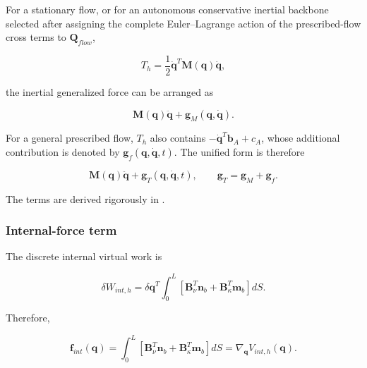For a stationary flow, or for an autonomous conservative inertial backbone selected after assigning the complete Euler--Lagrange action of the prescribed-flow cross terms to \(\mathbf{Q}_{flow}\),

\begin{equation}
\label{eq:galerkin-2-66}
T_{h} = \frac{1}{2}{\dot{\mathbf{q}}}^{T}\mathbf{M}\left( \mathbf{q} \right)\dot{\mathbf{q}},
\end{equation}

the inertial generalized force can be arranged as

\begin{equation}
\label{eq:galerkin-2-67}
\mathbf{M}\left( \mathbf{q} \right)\ddot{\mathbf{q}} + \mathbf{g}_{M}\left( \mathbf{q},\dot{\mathbf{q}} \right).
\end{equation}

For a general prescribed flow, \(T_{h}\) also contains \(- {\dot{\mathbf{q}}}^{T}\mathbf{b}_{A} + c_{A}\), whose additional contribution is denoted by \(\mathbf{g}_{f}\left( \mathbf{q},\dot{\mathbf{q}},t \right)\). The unified form is therefore

\begin{equation}
\label{eq:galerkin-2-68}
\boxed{\mathbf{M}\left( \mathbf{q} \right)\ddot{\mathbf{q}} + \mathbf{g}_{T}\left( \mathbf{q},\dot{\mathbf{q}},t \right),\quad\quad\mathbf{g}_{T} = \mathbf{g}_{M} + \mathbf{g}_{f}.}
\end{equation}

The terms are derived rigorously in .

\subsubsection{Internal-force term}\label{sec:galerkin-2-5-2}

The discrete internal virtual work is

\begin{equation}
\label{eq:galerkin-2-69}
\delta W_{int,h} = \delta\mathbf{q}^{T}\int_{0}^{L}\left\lbrack \mathbf{B}_{\nu}^{T}\mathbf{n}_{b} + \mathbf{B}_{\kappa}^{T}\mathbf{m}_{b} \right\rbrack dS.
\end{equation}

Therefore,

\begin{equation}
\label{eq:galerkin-2-70}
\mathbf{f}_{int}\left( \mathbf{q} \right) = \int_{0}^{L}\left\lbrack \mathbf{B}_{\nu}^{T}\mathbf{n}_{b} + \mathbf{B}_{\kappa}^{T}\mathbf{m}_{b} \right\rbrack dS = \nabla_{\mathbf{q}}V_{int,h}\left( \mathbf{q} \right).
\end{equation}

